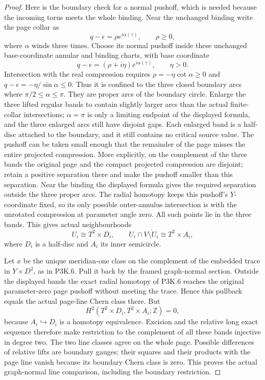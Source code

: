 \begin{proof}
Here is the boundary check for a normal pushoff, which is needed because the incoming torus meets the whole binding. Near the unchanged binding write the page collar as \[
 q-\epsilon=\rho e^{i\alpha(\gamma)},\qquad \rho\geq0,
\] where \(\alpha\) winds three times. Choose its normal pushoff inside these unchanged base-coordinate annular and binding charts, with base coordinate \[
 q-\epsilon=(\rho+i\eta)e^{i\alpha(\gamma)},
 \qquad\eta>0.
\] Intersection with the real compression requires \(\rho=-\eta\cot\alpha\geq0\) and \(q-\epsilon=-\eta/\sin\alpha\leq0\). Thus it is confined to the three closed boundary arcs where \(\pi/2\leq\alpha\leq\pi\). They are proper arcs of the boundary circle. Enlarge the three lifted regular bands to contain slightly larger arcs than the actual finite-collar intersections; \(\alpha=\pi\) is only a limiting endpoint of the displayed formula, and the three enlarged arcs still have disjoint gaps. Each enlarged band is a half-disc attached to the boundary, and it still contains no critical source value. The pushoff can be taken small enough that the remainder of the page misses the entire projected compression. More explicitly, on the complement of the three bands the original page and the compact projected compression are disjoint; retain a positive separation there and make the pushoff smaller than this separation. Near the binding the displayed formula gives the required separation outside the three proper arcs. The radial homotopy keeps this pushoff's \(Y\)-coordinate fixed, so its only possible outer-annulus intersection is with the unrotated compression at parameter angle zero. All such points lie in the three bands. This gives actual neighbourhoods \[
 U_i\cong T^2\times D_i,
 \qquad U_i\cap\overline{V\setminus U_i}
       \cong T^2\times A_i,
\] where \(D_i\) is a half-disc and \(A_i\) its inner semicircle.

Let \(x\) be the unique meridian-one class on the complement of the embedded trace in \(Y\times D^2\), as in P3K.6. Pull it back by the framed graph-normal section. Outside the displayed bands the exact radial homotopy of P3K.6 reaches the original parameter-zero page pushoff without meeting the trace. Hence this pullback equals the actual page-line Chern class there. But \[
 H^2(T^2\times D_i,T^2\times A_i;\mathbb Z)=0,
\] because \(A_i\hookrightarrow D_i\) is a homotopy equivalence. Excision and the relative long exact sequence therefore make restriction to the complement of all these bands injective in degree two. The two line classes agree on the whole page. Possible differences of relative lifts are boundary gauges; their squares and their products with the page line vanish because its boundary Chern class is zero. This proves the actual graph-normal line comparison, including the boundary restriction.


\end{proof}
